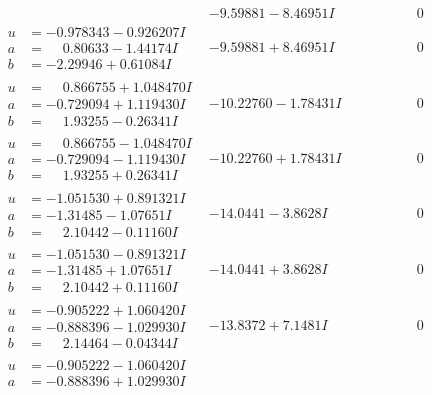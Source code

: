 \documentclass[1p]{elsarticle_modified}
\theoremstyle{definition}
\begin{document}
$$\begin{array}{c|c|c}
 & -9.59881 - 8.46951 I & \phantom{-0.000000 } 0 \\ \hline\begin{aligned}
u &= -0.978343 - 0.926207 I \\
a &= \phantom{-}0.80633 - 1.44174 I \\
b &= -2.29946 + 0.61084 I\end{aligned}
 & -9.59881 + 8.46951 I & \phantom{-0.000000 } 0 \\ \hline\begin{aligned}
u &= \phantom{-}0.866755 + 1.048470 I \\
a &= -0.729094 + 1.119430 I \\
b &= \phantom{-}1.93255 - 0.26341 I\end{aligned}
 & -10.22760 - 1.78431 I & \phantom{-0.000000 } 0 \\ \hline\begin{aligned}
u &= \phantom{-}0.866755 - 1.048470 I \\
a &= -0.729094 - 1.119430 I \\
b &= \phantom{-}1.93255 + 0.26341 I\end{aligned}
 & -10.22760 + 1.78431 I & \phantom{-0.000000 } 0 \\ \hline\begin{aligned}
u &= -1.051530 + 0.891321 I \\
a &= -1.31485 - 1.07651 I \\
b &= \phantom{-}2.10442 - 0.11160 I\end{aligned}
 & -14.0441 - 3.8628 I & \phantom{-0.000000 } 0 \\ \hline\begin{aligned}
u &= -1.051530 - 0.891321 I \\
a &= -1.31485 + 1.07651 I \\
b &= \phantom{-}2.10442 + 0.11160 I\end{aligned}
 & -14.0441 + 3.8628 I & \phantom{-0.000000 } 0 \\ \hline\begin{aligned}
u &= -0.905222 + 1.060420 I \\
a &= -0.888396 - 1.029930 I \\
b &= \phantom{-}2.14464 - 0.04344 I\end{aligned}
 & -13.8372 + 7.1481 I & \phantom{-0.000000 } 0 \\ \hline\begin{aligned}
u &= -0.905222 - 1.060420 I \\
a &= -0.888396 + 1.029930 I \\

\end{aligned}
\end{array}$$
\end{document}
